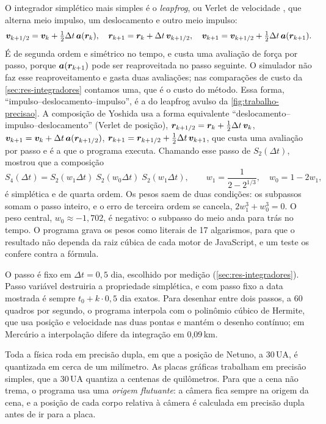 O integrador simplético mais simples é o \emph{leapfrog}, ou Verlet de velocidade \cite{verlet1967}, que alterna meio impulso, um deslocamento e outro meio impulso:
\begin{equation}
  \bm{v}_{k+1/2} = \bm{v}_k + \tfrac12\Delta t\,\bm{a}(\bm{r}_k),\quad
  \bm{r}_{k+1}   = \bm{r}_k + \Delta t\,\bm{v}_{k+1/2},\quad
  \bm{v}_{k+1}   = \bm{v}_{k+1/2} + \tfrac12\Delta t\,\bm{a}(\bm{r}_{k+1}).
  \label{eq:leapfrog}
\end{equation}
É de segunda ordem e simétrico no tempo, e custa uma avaliação de força por passo, porque $\bm{a}(\bm{r}_{k+1})$ pode ser reaproveitada no passo seguinte. O simulador não faz esse reaproveitamento e gasta duas avaliações; nas comparações de custo da \autoref{sec:res-integradores} contamos uma, que é o custo do método. Essa forma, ``impulso--deslocamento--impulso'', é a do leapfrog avulso da \autoref{fig:trabalho-precisao}. A composição de Yoshida usa a forma equivalente ``deslocamento--impulso--deslocamento'' (Verlet de posição), $\bm{r}_{k+1/2}=\bm{r}_k+\tfrac12\Delta t\,\bm{v}_k$, $\bm{v}_{k+1}=\bm{v}_k+\Delta t\,\bm{a}(\bm{r}_{k+1/2})$, $\bm{r}_{k+1}=\bm{r}_{k+1/2}+\tfrac12\Delta t\,\bm{v}_{k+1}$, que custa uma avaliação por passo e é a que o programa executa. Chamando esse passo de $S_2(\Delta t)$,  mostrou que a composição
\begin{equation}
  S_4(\Delta t) = S_2(w_1\Delta t)\;S_2(w_0\Delta t)\;S_2(w_1\Delta t),\qquad
  w_1 = \frac{1}{2 - 2^{1/3}},\quad w_0 = 1 - 2w_1,
  \label{eq:yoshida}
\end{equation}
é simplética e de quarta ordem. Os pesos saem de duas condições: os subpassos somam o passo inteiro, e o erro de terceira ordem se cancela, $2w_1^3 + w_0^3 = 0$. O peso central, $w_0\approx-1{,}702$, é negativo: o subpasso do meio anda para trás no tempo. O programa grava os pesos como literais de 17 algarismos, para que o resultado não dependa da raiz cúbica de cada motor de JavaScript, e um teste os confere contra a fórmula.

O passo é fixo em $\Delta t = 0{,}5$ dia, escolhido por medição (\autoref{sec:res-integradores}). Passo variável destruiria a propriedade simplética, e com passo fixo a data mostrada é sempre $t_0 + k\cdot0{,}5$ dia exatos. Para desenhar entre dois passos, a 60 quadros por segundo, o programa interpola com o polinômio cúbico de Hermite, que usa posição e velocidade nas duas pontas e mantém o desenho contínuo; em Mercúrio a interpolação difere da integração em 0,09\,km.

Toda a física roda em precisão dupla, em que a posição de Netuno, a 30\,UA, é quantizada em cerca de um milímetro. As placas gráficas trabalham em precisão simples, que a 30\,UA quantiza a centenas de quilômetros. Para que a cena não trema, o programa usa uma \emph{origem flutuante}\label{sec:origem-flutuante}: a câmera fica sempre na origem da cena, e a posição de cada corpo relativa à câmera é calculada em precisão dupla antes de ir para a placa.

